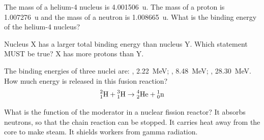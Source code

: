 \begin{quizq}{}
The mass of a helium-4 nucleus is \qty{4.001506}{u}. The mass of a proton is \qty{1.007276}{u} and the
mass of a neutron is \qty{1.008665}{u}. What is the binding energy of the helium-4 nucleus?
\end{quizq}

\begin{quizq}{}
Nucleus X has a larger total binding energy than nucleus Y. Which statement MUST be true?
  {X has more protons than Y.}
\end{quizq}

\begin{quizq}{}
The binding energies of three nuclei are: , \qty{2.22}{MeV}; , \qty{8.48}{MeV};
, \qty{28.30}{MeV}. How much energy is released in this fusion reaction?
\[ \prescript{2}{1}{\mathrm{H}} + \prescript{3}{1}{\mathrm{H}} \rightarrow \prescript{4}{2}{\mathrm{He}} + \prescript{1}{0}{\mathrm{n}} \]
\end{quizq}

\begin{quizq}{}
What is the function of the moderator in a nuclear fission reactor?
  {It absorbs neutrons, so that the chain reaction can be stopped.}
  {It carries heat away from the core to make steam.}
  {It shields workers from gamma radiation.}
\end{quizq}

